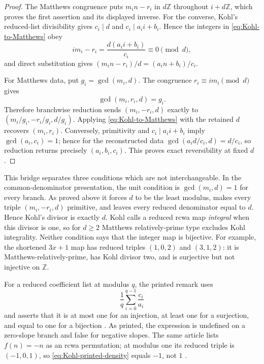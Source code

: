 \begin{proof}
The Matthews congruence puts $m_i n-r_i$ in $d\mathbb Z$ throughout
$i+d\mathbb Z$, which proves the first assertion and its displayed inverse.
For the converse, Kohl's reduced-list divisibility gives
$c_i\mid d$ and $c_i\mid a_i i+b_i$.  Hence the integers in
\eqref{eq:Kohl-to-Matthews} obey
\[
 i m_i-r_i=\frac{d(a_i i+b_i)}{c_i}\equiv0\pmod d,
\]
and direct substitution gives
$(m_i n-r_i)/d=(a_i n+b_i)/c_i$.

For Matthews data, put $g_i=\gcd(m_i,d)$.  The congruence
$r_i\equiv i m_i\pmod d$ gives
\[
 \gcd(m_i,r_i,d)=g_i.
\]
Therefore branchwise reduction sends
$(m_i,-r_i,d)$ exactly to
$(m_i/g_i,-r_i/g_i,d/g_i)$.  Applying
\eqref{eq:Kohl-to-Matthews} with the retained $d$ recovers $(m_i,r_i)$.
Conversely, primitivity and $c_i\mid a_i i+b_i$ imply
$\gcd(a_i,c_i)=1$; hence for the reconstructed data
$\gcd(a_i d/c_i,d)=d/c_i$, so reduction returns precisely
$(a_i,b_i,c_i)$.  This proves exact reversibility at fixed $d$.
\end{proof}

This bridge separates three conditions which are not interchangeable.  In the
common-denominator presentation, the unit condition is
$\gcd(m_i,d)=1$ for every branch.  As proved above it forces $d$ to be the
least modulus, makes every triple $(m_i,-r_i,d)$ primitive, and leaves every
reduced denominator equal to $d$.  Hence Kohl's divisor is exactly $d$.
Kohl calls a reduced rcwa map \emph{integral} when this divisor is one, so for
$d\geq2$ Matthews relatively-prime type excludes Kohl integrality.  Neither
condition says that the integer map is bijective.  For example, the shortened
$3x+1$ map has reduced triples
$(1,0,2)$ and $(3,1,2)$: it is Matthews-relatively-prime, has Kohl divisor two,
and is surjective but not injective on $\mathbb Z$.

\begin{sourceissue}
\label{issue:Kohl-signed-density}
For a reduced coefficient list at modulus $q$, the printed remark uses
\begin{equation}
\label{eq:Kohl-printed-density}
 \frac1q\sum_{i=0}^{q-1}\frac{c_i}{a_i}
\end{equation}
and asserts that it is at most one for an injection, at least one for a
surjection, and equal to one for a bijection
\cite[Rem.~1.2]{Kohl2008}.  As printed, the expression is undefined on a
zero-slope branch and false for negative slopes.  The same article lists
$f(n)=-n$ as an rcwa permutation; at modulus one its reduced triple is
$(-1,0,1)$, so \eqref{eq:Kohl-printed-density} equals $-1$, not $1$
\cite[Def.~2.4 and following example]{Kohl2008}.
\end{sourceissue}

